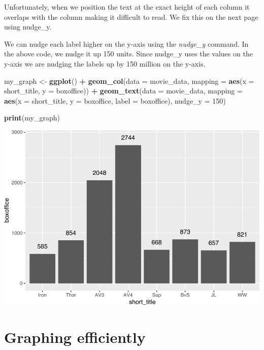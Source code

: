 \documentclass[
]{krantz}
\makeatletter
\newenvironment{Shaded}{\begin{snugshade}}{\end{snugshade}}
\newcommand{\DataTypeTok}[1]{\textcolor[rgb]{0.27,0.27,0.27}{#1}}
\newcommand{\DecValTok}[1]{\textcolor[rgb]{0.06,0.06,0.06}{#1}}
\newcommand{\KeywordTok}[1]{\textcolor[rgb]{0.27,0.27,0.27}{\textbf{#1}}}
\newcommand{\NormalTok}[1]{#1}
\newcommand{\OperatorTok}[1]{\textcolor[rgb]{0.43,0.43,0.43}{\textbf{#1}}}
\newcommand{\StringTok}[1]{\textcolor[rgb]{0.5,0.5,0.5}{#1}}
\newenvironment{kframe}{%
\medskip{}
\setlength{\fboxsep}{.8em}
 \def\at@end@of@kframe{}%
 \ifinner\ifhmode%
  \def\at@end@of@kframe{\end{minipage}}%
  \begin{minipage}{\columnwidth}%
 \fi\fi%
 \def\FrameCommand##1{\hskip\@totalleftmargin \hskip-\fboxsep
 \colorbox{shadecolor}{##1}\hskip-\fboxsep
     \hskip-\linewidth \hskip-\@totalleftmargin \hskip\columnwidth}%
 \MakeFramed {\advance\hsize-\width
   \@totalleftmargin\z@ \linewidth\hsize
   \@setminipage}}%
 {\par\unskip\endMakeFramed%
 \at@end@of@kframe}
\renewenvironment{Shaded}{\begin{kframe}}{\end{kframe}}
\makeatother
\begin{document}
Unfortunately, when we position the text at the exact height of each column it overlaps with the column making it difficult to read. We fix this on the next page using nudge\_y.

We can nudge each label higher on the y-axis using the \emph{nudge\_y} command. In the above code, we nudge it up 150 units. Since nudge\_y uses the values on the y-axis we are nudging the labels up by 150 million on the y-axis.

\begin{Shaded}
\begin{Highlighting}[]
\NormalTok{my_graph <-}\StringTok{ }\KeywordTok{ggplot}\NormalTok{() }\OperatorTok{+}
\StringTok{  }\KeywordTok{geom_col}\NormalTok{(}\DataTypeTok{data =}\NormalTok{ movie_data,}
           \DataTypeTok{mapping =} \KeywordTok{aes}\NormalTok{(}\DataTypeTok{x =}\NormalTok{ short_title, }
                         \DataTypeTok{y =}\NormalTok{ boxoffice)) }\OperatorTok{+}
\StringTok{  }\KeywordTok{geom_text}\NormalTok{(}\DataTypeTok{data =}\NormalTok{ movie_data, }
           \DataTypeTok{mapping =} \KeywordTok{aes}\NormalTok{(}\DataTypeTok{x =}\NormalTok{ short_title, }
                         \DataTypeTok{y =}\NormalTok{ boxoffice, }
                         \DataTypeTok{label =}\NormalTok{ boxoffice),}
           \DataTypeTok{nudge_y =} \DecValTok{150}\NormalTok{)}

\KeywordTok{print}\NormalTok{(my_graph)}
\end{Highlighting}
\end{Shaded}

\includegraphics[width=0.65\linewidth]{bookdown_files/figure-latex/unnamed-chunk-263-1}

\hypertarget{graphing-efficiently}{%
\section{Graphing efficiently}\label{graphing-efficiently}}
\end{document}
